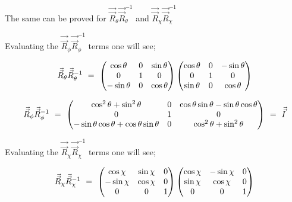 \documentclass[11pt]{article}
\begin{document}
The same can be proved for \begin{math} \vec{\vec{R}}_{\theta} \vec{\vec{R}}_{\theta}^{-1} \end{math} and \begin{math} \vec{\vec{R}}_{\chi} \vec{\vec{R}}_{\chi}^{-1} \end{math} 

Evaluating the \begin{math} \vec{\vec{R}}_{\phi} \vec{\vec{R}}_{\phi}^{-1} \end{math} terms one will see;

\begin{equation}
\vec{\vec{R}}_{\theta} \vec{\vec{R}}_{\theta}^{-1}  \hspace{0.125cm} = \hspace{0.125cm} 
\begin{pmatrix}
\cos{\theta} & 0 & \sin{\theta} \\
0 & 1 & 0 \\
-\sin{\theta} & 0 & \cos{\theta} 
\end{pmatrix}
\begin{pmatrix}
\cos{\theta} & 0 & -\sin{\theta} \\
0 & 1 & 0 \\
\sin{\theta} & 0 & \cos{\theta} 
\end{pmatrix}
\end{equation}

\begin{equation}
\vec{\vec{R}}_{\phi} \vec{\vec{R}}_{\phi}^{-1} 
\hspace{0.125cm} = \hspace{0.125cm} 
\begin{pmatrix}
\cos^{2}{\theta} + \sin^{2}{\theta} & 0 & \cos{\theta} \sin{\theta} - \sin{\theta} \cos{\theta}  \\
0 & 1 & 0 \\
- \sin{\theta} \cos{\theta} + \cos{\theta} \sin{\theta}  & 0 & \cos^{2}{\theta} + \sin^{2}{\theta} 
\end{pmatrix}
\hspace{0.125cm} = \hspace{0.125cm} \vec{\vec{I}}
\end{equation}

Evaluating the \begin{math} \vec{\vec{R}}_{\chi} \vec{\vec{R}}_{\chi}^{-1} \end{math} terms one will see;

\begin{equation}
\vec{\vec{R}}_{\chi} \vec{\vec{R}}_{\chi}^{-1} \hspace{0.125cm} = \hspace{0.125cm} 
\begin{pmatrix}
\cos{\chi} & \sin{\chi} & 0 \\
-\sin{\chi} & \cos{\chi} & 0 \\
0 & 0 & 1 
\end{pmatrix}
\begin{pmatrix}
\cos{\chi} & -\sin{\chi} & 0 \\
\sin{\chi} & \cos{\chi} & 0 \\
0 & 0 & 1 
\end{pmatrix}
\end{equation}
\end{document}
